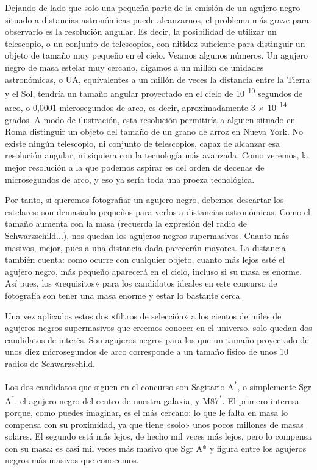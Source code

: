 Dejando de lado que solo una pequeña parte de la emisión de un agujero negro situado a distancias astronómicas puede alcanzarnos, el problema más grave para observarlo es la resolución angular. Es decir, la posibilidad de utilizar un telescopio, o un conjunto de telescopios, con nitidez suficiente para distinguir un objeto de tamaño muy pequeño en el cielo. Veamos algunos números. Un agujero negro de masa estelar muy cercano, digamos a un millón de unidades astronómicas, o UA, equivalentes a un millón de veces la distancia entre la Tierra y el Sol, tendría un tamaño angular proyectado en el cielo de 10\textsuperscript{--10} segundos de arco, o 0,0001 microsegundos de arco, es decir, aproximadamente 3 × 10\textsuperscript{--14} grados. A modo de ilustración, esta resolución permitiría a alguien situado en Roma distinguir un objeto del tamaño de un grano de arroz en Nueva York. No existe ningún telescopio, ni conjunto de telescopios, capaz de alcanzar esa resolución angular, ni siquiera con la tecnología más avanzada. Como veremos, la mejor resolución a la que podemos aspirar es del orden de decenas de microsegundos de arco, y eso ya sería toda una proeza tecnológica.

Por tanto, si queremos fotografiar un agujero negro, debemos descartar los estelares: son demasiado pequeños para verlos a distancias astronómicas. Como el tamaño aumenta con la masa (recuerda la expresión del radio de Schwarzschild...), nos quedan los agujeros negros supermasivos. Cuanto más masivos, mejor, pues a una distancia dada parecerán mayores. La distancia también cuenta: como ocurre con cualquier objeto, cuanto más lejos esté el agujero negro, más pequeño aparecerá en el cielo, incluso si su masa es enorme. Así pues, los «requisitos» para los candidatos ideales en este concurso de fotografía son tener una masa enorme y estar lo bastante cerca.

Una vez aplicados estos dos «filtros de selección» a los cientos de miles de agujeros negros supermasivos que creemos conocer en el universo, solo quedan dos candidatos de interés. Son agujeros negros para los que un tamaño proyectado de unos diez microsegundos de arco corresponde a un tamaño físico de unos 10 radios de Schwarzschild.

Los dos candidatos que siguen en el concurso son Sagitario A\textsuperscript{*}, o simplemente Sgr A\textsuperscript{*}, el agujero negro del centro de nuestra galaxia, y M87\textsuperscript{*}. El primero interesa porque, como puedes imaginar, es el más cercano: lo que le falta en masa lo compensa con su proximidad, ya que tiene «solo» unos pocos millones de masas solares. El segundo está más lejos, de hecho mil veces más lejos, pero lo compensa con su masa: es casi mil veces más masivo que Sgr A* y figura entre los agujeros negros más masivos que conocemos.

